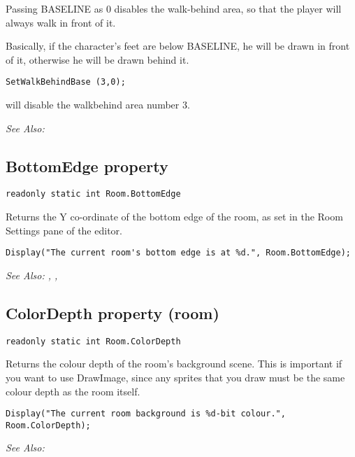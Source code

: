 Passing BASELINE as 0 disables the walk-behind area, so that the player
will always walk in front of it.

Basically, if the character's feet are below BASELINE, he will be drawn in
front of it, otherwise he will be drawn behind it.

\begin{verbatim}
SetWalkBehindBase (3,0);
\end{verbatim}
will disable the walkbehind area number 3.

\it{See Also:} 


\subsection{BottomEdge property}\label{Room.BottomEdge}%

\begin{verbatim}
readonly static int Room.BottomEdge
\end{verbatim}
Returns the Y co-ordinate of the bottom edge of the room, as set in the Room Settings
pane of the editor.

\begin{verbatim}
Display("The current room's bottom edge is at %d.", Room.BottomEdge);
\end{verbatim}

\it{See Also:} , ,


\subsection{ColorDepth property (room)}\label{Room.ColorDepth}%

\begin{verbatim}
readonly static int Room.ColorDepth
\end{verbatim}
Returns the colour depth of the room's background scene. This is important if
you want to use DrawImage, since any sprites that you draw must be the same
colour depth as the room itself.

\begin{verbatim}
Display("The current room background is %d-bit colour.", Room.ColorDepth);
\end{verbatim}

\it{See Also:} 


